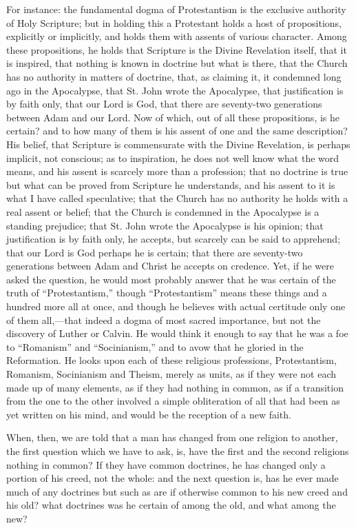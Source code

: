 For instance: the fundamental dogma of Protestantism is the
exclusive authority of Holy Scripture; but in holding this a
Protestant holds a host of propositions, explicitly or implicitly, and
holds them with assents of various character. Among these
propositions, he holds that Scripture is the Divine Revelation
itself, that it is inspired, that nothing is known in doctrine but
what is there, that the Church has no authority in matters of
doctrine, that, as claiming it, it condemned long ago in the
Apocalypse, that St. John wrote the Apocalypse, that justification is
by faith only, that our Lord is God, that there are seventy-two
generations between Adam and our Lord. Now of which, out of all these
propositions, is he certain? and to how many of them is his assent of
one and the same description? His belief, that Scripture is
commensurate with the Divine Revelation, is perhaps implicit, not
conscious; as to inspiration, he does not well know what the word
means, and his assent is scarcely more than a profession; that no
doctrine is true but what can be proved from Scripture he understands,
and his assent to it is what I have called speculative; that the
Church has no authority he holds with a real assent or belief; that
the Church is condemned in the Apocalypse is a standing prejudice;
that St. John wrote the Apocalypse is his opinion; that justification
is by faith only, he accepts, but scarcely can be said to apprehend;
that our Lord is God perhaps he is certain; that there are seventy-two
generations between Adam and Christ he accepts on credence. Yet, if he
were asked the question, he would most probably answer that he was
certain of the truth of ``Protestantism,'' though
``Protestantism'' means these things and a hundred more all at
once, and though he believes with actual certitude only one of them
all,—that indeed a dogma of most sacred importance, but not the
discovery of Luther or Calvin. He would think it enough to say
that he was a foe to ``Romanism'' and ``Socinianism,''
and to avow that he gloried in the Reformation. He looks upon each of
these religious professions, Protestantism, Romanism, Socinianism and
Theism, merely as units, as if they were not each made up of many
elements, as if they had nothing in common, as if a transition from
the one to the other involved a simple obliteration of all that had
been as yet written on his mind, and would be the reception of a new
faith.

When, then, we are told that a man has changed from one religion to
another, the first question which we have to ask, is, have the first
and the second religions nothing in common? If they have common
doctrines, he has changed only a portion of his creed, not the whole:
and the next question is, has he ever made much of any doctrines but
such as are if otherwise common to his new creed and his old? what
doctrines was he certain of among the old, and what among the new?

